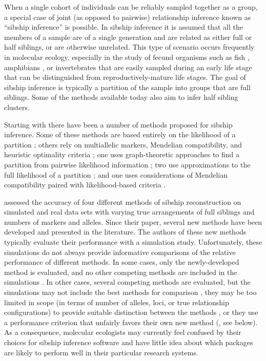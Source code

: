 \documentclass[11pt]{article}
\begin{document}
When a single cohort of individuals can be reliably sampled together as a group, a special case of 
joint (as opposed to pairwise) relationship inference known as ``sibship inference'' is possible.  In 
sibship inference it is assumed that all the members of a sample are of a single generation and are 
related as either full or half siblings, or are otherwise unrelated. This type of scenario occurs 
frequently in molecular ecology, especially in the study of fecund organisms such as fish 
\citep{And&Dun2008}, amphibians \citep{Halversonetal2006}, or invertebrates \citep{read12} that are 
easily sampled during an early life stage that can be distinguished from reproductively-mature life 
stages.  The goal of sibship inference is typically a partition of the sample into groups that are full 
siblings. Some of the methods available today also aim to infer half sibling clusters.  

Starting with \citet{painter97} there have been a number of methods proposed for sibship inference.  
Some of these methods are based entirely on the likelihood of a partition 
\citep{painter97,thomas02,wang04,wang09}; others rely on multiallelic markers, Mendelian compatibility, 
and heuristic optimality criteria \citep{konovalov04,bergerwolf07,sheik08}; one  uses graph-theoretic 
approaches to find a partition from pairwise likelihood information \citep{beyer03}; two use 
approximations to the full likelihood of a partition \citep{Smithetal2001,Wang2012pairwise}; and one 
uses considerations of Mendelian compatibility paired with likelihood-based criteria 
\citep{almudevar99}. 

\citet{butler04} assessed the accuracy of four different methods of sibship reconstruction on simulated 
and real data sets with varying true arrangements of full siblings and numbers of markers and alleles. 
Since their paper, several new methods have been developed and presented in the literature.  The 
authors of these new methods typically evaluate their performance with a simulation study.  
Unfortunately, these simulations do not always provide informative comparisons of the relative 
performance of different methods. In some cases, only the newly-developed method is evaluated, and no 
other competing methods are included in the simulations \citep{beyer03,wang04,wang09}.  In other cases, 
several competing methods are evaluated, but the simulations may not include the best methods for 
comparison \citep{bergerwolf07}, they may be too limited in scope (in terms of number of alleles, loci, 
or true relationship configurations) to provide suitable distinction between the methods 
\citep{alm&and11,ashley09}, or they use a performance criterion that unfairly favors their own new 
method (\citealt{bergerwolf07,chaovalitwongse07,ashley09}, see below).  As a consequence, molecular 
ecologists may currently feel confused by their choices for sibship inference software and have little 
idea about which packages are likely to perform well in their particular research systems. 
\end{document}
